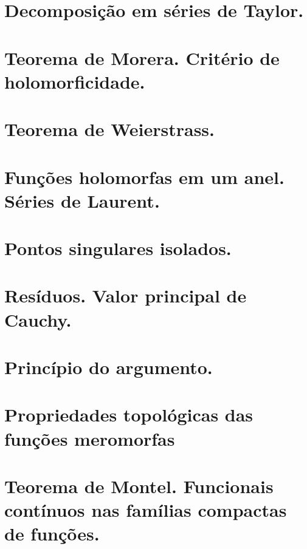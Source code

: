 \section{Decomposição em séries de Taylor.}

\section{Teorema de Morera. Critério de holomorficidade.}

\section{Teorema de Weierstrass.}

\section{Funções holomorfas em um anel. Séries de Laurent.}

\section{Pontos singulares isolados.}

\section{Resíduos. Valor principal de Cauchy.}

\section{Princípio do argumento.}
\begin{defin}
\end{defin}
\begin{teorema}
\end{teorema}
\begin{teorema}[Rouché]
\end{teorema}
\begin{cor}
\end{cor}

\section{Propriedades topológicas das funções meromorfas}

\section{Teorema de Montel. Funcionais contínuos nas famílias compactas de funções.}

